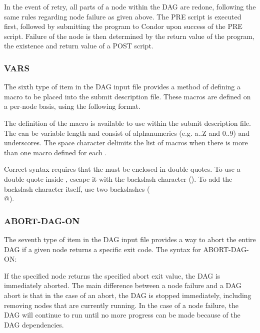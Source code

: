 In the event of retry, all parts of a node within the DAG
are redone, following the same rules regarding node failure
as given above.
The PRE script is executed first,
followed by submitting the program to Condor upon success of
the PRE script.
Failure of the node is then determined by the return value of
the program, the existence and return value of a POST script.

\subsubsection{VARS}

The sixth type of item in the DAG input file provides a
method of defining a macro to be placed into the submit description
file.
These macros are defined on a per-node basis, using the
following format.

  

The definition of the macro is available to use within the
submit description file.  The \verb@macroname@ can be variable
length and consist of alphanumerics (e.g. a..Z and 0..9) and
underscores.  The space character delimits the list of macros when
there is more than one macro defined for each .

Correct syntax requires that the \verb@string@ must be
enclosed in double quotes.
To use a double quote inside \verb@string@,
escape it with the backslash character (\verb@\@).
To add the backslash character itself, use two backslashes (\verb@\\@).


\subsubsection{ABORT-DAG-ON}

The seventh type of item in the DAG input file provides a way
to abort the entire DAG if a given node returns a specific exit
code.  The syntax for ABORT-DAG-ON:

  

If the specified node returns the specified abort exit value, the
DAG is immediately aborted.  The main difference between a node
failure and a DAG abort is that
in the case of an abort, the DAG is stopped immediately, including
removing nodes that are currently running.  In the case of a node
failure, the DAG will continue to run until no more progress can
be made because of the DAG dependencies.

